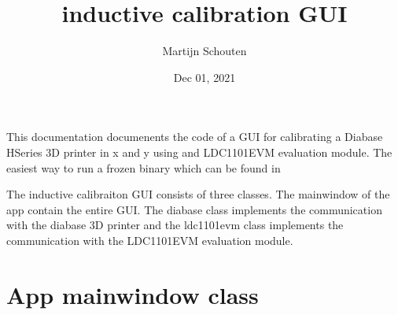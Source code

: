 \documentclass[letterpaper,10pt,english]{sphinxmanual}
\title{inductive calibration GUI}
\date{Dec 01, 2021}
\author{Martijn Schouten}
\begin{document}
\pagestyle{empty}
\sphinxmaketitle
\pagestyle{plain}
\sphinxtableofcontents
\pagestyle{normal}
\label{\detokenize{index::doc}}


\sphinxAtStartPar
This documentation documenents the code of a GUI for calibrating a Diabase H\sphinxhyphen{}Series 3D printer in x and y using and LDC1101EVM evaluation module. The easiest way to run a frozen binary which can be found in 

\sphinxAtStartPar
The inductive calibraiton GUI consists of three classes. The mainwindow of the app contain the entire GUI. The diabase class implements the communication with the diabase 3D printer and the ldc1101evm class implements the communication with the LDC1101EVM evaluation module.


\chapter{App mainwindow class}
\label{\detokenize{index:app-mainwindow-class}}\label{\detokenize{index:module-app}}\label{\detokenize{index:module-0}}
\end{document}
